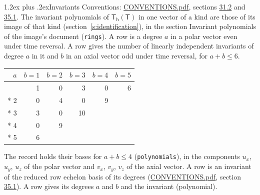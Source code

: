 \documentclass[10pt,a4paper]{article}
\makeatletter
\renewcommand\section{\@startsection{section}{1}{\z@}{-3ex plus -1ex minus -.2ex}%
  {1.2ex plus .2ex}{\normalfont\large\sffamily\bfseries\color{parttitle}}}
\numberwithin{equation}{section}
\newcommand{\grp}[1]{\mathsf{#1}}
\makeatother
\begin{document}
\section{Invariants}\label{s:invariants}
Conventions: \href{../../CONVENTIONS.pdf}{CONVENTIONS.pdf}, sections \href{../../CONVENTIONS.pdf\#conv.31.2}{31.2} and \href{../../CONVENTIONS.pdf\#conv.35.1}{35.1}.
The invariant polynomials of $\grp{T_{h}}(\grp{T})$ in one vector of a kind are those of its image of that kind (section~\ref{s:identification}), in the section Invariant polynomials of the image's document (\texttt{rings}).
\leavevmode\label{n:index.degree.polar}\label{n:index.degree.axial}A row is a degree $a$ in a polar vector even under time reversal. A row gives the number of linearly independent invariants of degree $a$ in it and $b$ in an axial vector odd under time reversal, for $a + b \le 6$.
{\small\begin{longtable}{@{}rrrrrr@{}}\toprule
$a$ & $b = 1$ & $b = 2$ & $b = 3$ & $b = 4$ & $b = 5$\\\midrule\endhead
\bottomrule\endfoot\endlastfoot
1 & 1 & 0 & 3 & 0 & 6\\*
2 & 0 & 4 & 0 & 9 & \\*
3 & 3 & 0 & 10 &  & \\*
4 & 0 & 9 &  &  & \\*
5 & 6 &  &  &  & \\
\bottomrule\end{longtable}}
\leavevmode\label{n:local.component.polar}\label{n:local.component.axial}The record holds their bases for $a + b \le 4$ (\texttt{polynomials}), in the components $u_{x}$, $u_{y}$, $u_{z}$ of the polar vector and $v_{x}$, $v_{y}$, $v_{z}$ of the axial vector. \label{n:head.polynomial}A row is an invariant of the reduced row echelon basis of its degrees (\href{../../CONVENTIONS.pdf}{CONVENTIONS.pdf}, section \href{../../CONVENTIONS.pdf\#conv.35.1}{35.1}). A row gives its degrees $a$ and $b$ and the invariant (polynomial).
\end{document}
